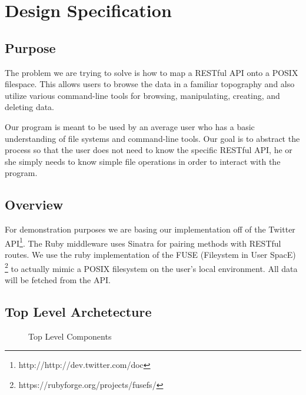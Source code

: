 \section{Design Specification}

\subsection{Purpose}

The problem we are trying to solve is how to map a RESTful API onto a POSIX
filespace. This allows users to browse the data in a familiar topography and
also utilize various command-line tools for browsing, manipulating, creating,
and deleting data. 

Our program is meant to be used by an average user who has a basic understanding
of file systems and command-line tools. Our goal is to abstract the process so
that the user does not need to know the specific RESTful API, he or she simply
needs to know simple file operations in order to interact with the program.

\subsection{Overview}

For demonstration purposes we are basing our implementation off of the Twitter
API\footnote{http://http://dev.twitter.com/doc}. The Ruby middleware uses Sinatra
for pairing methods with RESTful routes. We use the ruby implementation of the
FUSE (Fileystem in User SpacE) \footnote{https://rubyforge.org/projects/fusefs/}
to actually mimic a POSIX filesystem on the user's local environment. All data
will be fetched from the API.

\subsection{Top Level Archetecture}

\begin{figure}[h]
\centering
{}
\caption{Top Level Components}\label{fig:top-top}
\end{figure}

